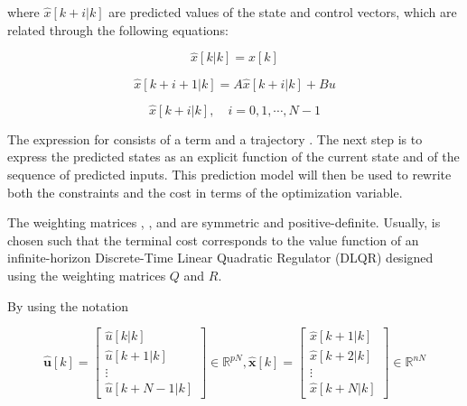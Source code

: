 \noindent
where $\hat{x}[k+i|k]$ are predicted values of the state and control vectors, which are 
related through the following equations:

\noindent
\begin{equation}
    \hat{x}[k|k] = x[k]
\end{equation}

\noindent
\begin{equation}
    \hat{x}[k + i + 1|k] = A \hat{x}[k+i|k] + Bu
\end{equation}

\noindent
\begin{equation}
    \hat{x}[k + i|k], \quad i =  0, 1, \dotsm, N-1
\end{equation}


The expression for  consists of a  term and a trajectory 
. The next step is to express the predicted states as an explicit function of the current state and of the sequence of predicted inputs. This prediction model will then be used to rewrite both the constraints and the cost in terms of the optimization variable.

The weighting matrices , , and  are symmetric and 
positive-definite. Usually,  is chosen such that the terminal cost 
 corresponds to the value function of an infinite-horizon 
Discrete-Time Linear Quadratic Regulator (DLQR) designed using the weighting matrices $Q$ and $R$.

By using the notation

\begin{equation}
    \mathbf{\hat{u}}[k] = 
    \left[
        \begin{matrix}
            \hat{u}[k | k] \\		
            \hat{u}[k + 1 | k] \\		
            \vdots \\
            \hat{u}[k + N-1 | k]
        \end{matrix}
    \right]
    \in \mathbb{R}^{pN},
    \mathbf{\hat{x}}[k] = 
    \left[
        \begin{matrix}
            \hat{x}[k + 1| k] \\ 
            \hat{x}[k + 2| k] \\ 
            \vdots \\
            \hat{x}[k + N | k]
        \end{matrix}
    \right]
    \in \mathbb{R}^{nN}
\end{equation}

